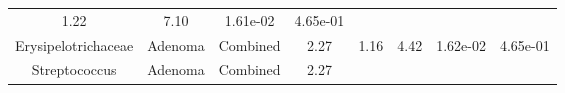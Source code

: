 \documentclass[12pt,]{article}
\begin{document}
\begin{longtable}[]{@{}cccccccc@{}}
\begin{minipage}[t]{0.13\columnwidth}
1.22\strut
\end{minipage} & \begin{minipage}[t]{0.13\columnwidth}\centering\strut
7.10\strut
\end{minipage} & \begin{minipage}[t]{0.07\columnwidth}\centering\strut
1.61e-02\strut
\end{minipage} & \begin{minipage}[t]{0.07\columnwidth}\centering\strut
4.65e-01\strut
\end{minipage}\tabularnewline
\begin{minipage}[t]{0.16\columnwidth}\centering\strut
Erysipelotrichaceae\strut
\end{minipage} & \begin{minipage}[t]{0.08\columnwidth}\centering\strut
Adenoma\strut
\end{minipage} & \begin{minipage}[t]{0.09\columnwidth}\centering\strut
Combined\strut
\end{minipage} & \begin{minipage}[t]{0.05\columnwidth}\centering\strut
2.27\strut
\end{minipage} & \begin{minipage}[t]{0.13\columnwidth}\centering\strut
1.16\strut
\end{minipage} & \begin{minipage}[t]{0.13\columnwidth}\centering\strut
4.42\strut
\end{minipage} & \begin{minipage}[t]{0.07\columnwidth}\centering\strut
1.62e-02\strut
\end{minipage} & \begin{minipage}[t]{0.07\columnwidth}\centering\strut
4.65e-01\strut
\end{minipage}\tabularnewline
\begin{minipage}[t]{0.16\columnwidth}\centering\strut
Streptococcus\strut
\end{minipage} & \begin{minipage}[t]{0.08\columnwidth}\centering\strut
Adenoma\strut
\end{minipage} & \begin{minipage}[t]{0.09\columnwidth}\centering\strut
Combined\strut
\end{minipage} & \begin{minipage}[t]{0.05\columnwidth}\centering\strut
2.27\strut
\end{minipage} & \begin{minipage}[t]{0.13\columnwidth}\centering\strut

\end{minipage}
\end{longtable}
\end{document}
